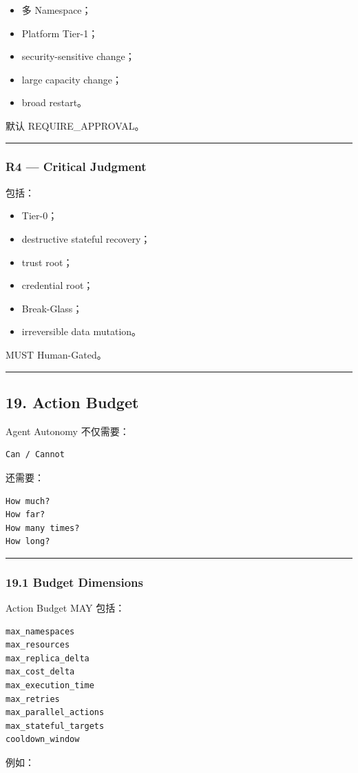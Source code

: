 \documentclass[11pt,a4paper]{article}
\begin{document}
\begin{itemize}
  \item 多 Namespace；
  \item Platform Tier-1；
  \item security-sensitive change；
  \item large capacity change；
  \item broad restart。
\end{itemize}
默认 REQUIRE\_APPROVAL。

\vspace{0.5em}\hrule\vspace{0.5em}
\subsubsection{R4 — Critical Judgment}
包括：

\begin{itemize}
  \item Tier-0；
  \item destructive stateful recovery；
  \item trust root；
  \item credential root；
  \item Break-Glass；
  \item irreversible data mutation。
\end{itemize}
MUST Human-Gated。

\vspace{0.5em}\hrule\vspace{0.5em}
\subsection{19. Action Budget}
Agent Autonomy 不仅需要：

\begin{lstlisting}[language=text]
Can / Cannot
\end{lstlisting}
还需要：

\begin{lstlisting}[language=text]
How much?
How far?
How many times?
How long?
\end{lstlisting}
\vspace{0.5em}\hrule\vspace{0.5em}
\subsubsection{19.1 Budget Dimensions}
Action Budget MAY 包括：

\begin{lstlisting}[language=text]
max_namespaces
max_resources
max_replica_delta
max_cost_delta
max_execution_time
max_retries
max_parallel_actions
max_stateful_targets
cooldown_window
\end{lstlisting}
例如：
\end{document}
